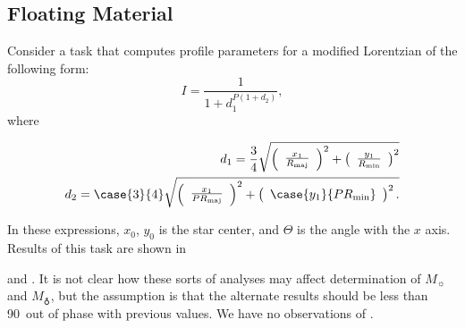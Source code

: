 \begin{article}
\section{Floating Material}
Consider a task that computes profile parameters for 
a modified Lorentzian of the following form:
\begin{equation}
   I = \frac{1}{1 + d_{1}^{P (1 + d_{2} )}}, 
\end{equation}
where
\begin{mathletters}
\begin{eqnarray}
   d_{1} = \frac{3}{4} \sqrt{ \left( \begin{array}{c} 
   \frac{x_{1}}{R_{\rm maj}} 
   \end{array} \right) ^{2} + \left( 
   \begin{array}{c} \frac{y_{1}}{R_{\rm min}} 
   \end{array} \right) ^{2} } \\
   d_{2} = \case{3}{4} \sqrt{ \left( 
   \begin{array}{c} \frac{x_{1}}{P R_{\rm maj}}
   \end{array} \right) ^{2} + \left( 
   \begin{array}{c} \case{y_{1}}{P R_{\rm min}} 
   \end{array} \right) ^{2}.}
\end{eqnarray}
\end{mathletters}
In these expressions, $x_{0}$, $y_{0}$ is the star 
center, and $\Theta$ is the angle with the $x$ axis.
Results of this task are shown in 
   
%
%
   
and
.
It is not clear how these sorts of analyses may affect 
determination of $M_{\sun}$ and $M_{\earth}$, but the 
assumption is that the alternate results should be less 
than 90\deg\ out of phase with previous values.  We have 
no observations of .



\end{article}
